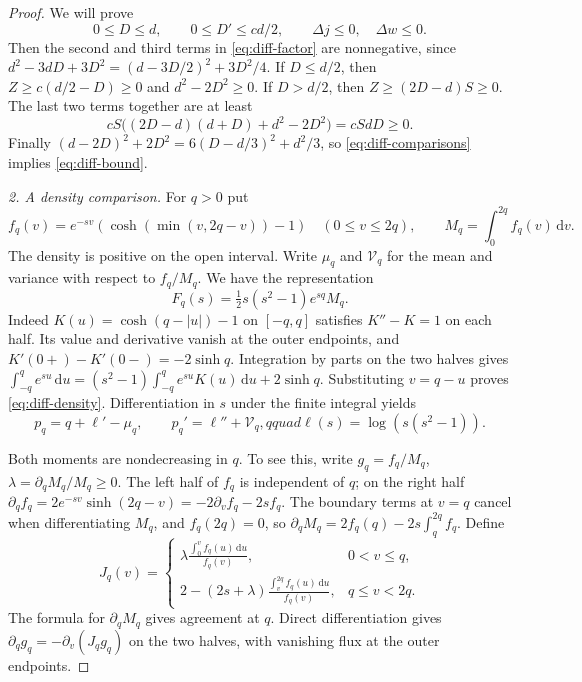\documentclass[10pt,twoside,reqno]{amsart}
\numberwithin{equation}{section}
\newcommand{\dd}{\,\mathrm{d}}
\begin{document}
\begin{proof}
We will prove
\begin{equation}\label{eq:diff-comparisons}
 0\le D\le d,\qquad 0\le D'\le cd/2,\qquad
 \Delta j\le0,\quad \Delta w\le0 .
\end{equation}
Then the second and third terms in \eqref{eq:diff-factor} are nonnegative,
since \(d^2-3dD+3D^2=(d-3D/2)^2+3D^2/4\).
If \(D\le d/2\), then \(Z\ge c(d/2-D)\ge0\) and
\(d^2-2D^2\ge0\). If \(D>d/2\), then \(Z\ge(2D-d)S\ge0\).
The last two terms together are at least
\[
 cS\bigl((2D-d)(d+D)+d^2-2D^2\bigr)=cS dD\ge0.
\]
Finally \((d-2D)^2+2D^2=6(D-d/3)^2+d^2/3\), so
\eqref{eq:diff-comparisons} implies \eqref{eq:diff-bound}.

\medskip\noindent
\textit{2. A density comparison.}
For \(q>0\) put
\[
 f_q(v)=e^{-sv}(\cosh(\min(v,2q-v))-1)\quad (0\le v\le 2q),
 \qquad M_q=\int_0^{2q} f_q(v)\dd v.
\]
The density is positive on the open interval. Write \(\mu_q\) and
\(\mathcal V_q\) for the mean and variance with respect to \(f_q/M_q\).
We have the representation
\begin{equation}\label{eq:diff-density}
 F_q(s)=\tfrac12 s(s^2-1)e^{sq}M_q.
\end{equation}
Indeed \(K(u)=\cosh(q-|u|)-1\) on \([-q,q]\) satisfies \(K''-K=1\)
on each half. Its value and derivative vanish at the outer endpoints,
and \(K'(0+)-K'(0-)=-2\sinh q\).
Integration by parts on the two halves gives
\(\int_{-q}^q e^{su}\dd u=(s^2-1)\int_{-q}^q e^{su}K(u)\dd u
 +2\sinh q\). Substituting \(v=q-u\) proves \eqref{eq:diff-density}.
Differentiation in \(s\) under the finite integral yields
\[
 p_q=q+\ell'-\mu_q,\qquad p_q'=\ell''+\mathcal V_q,qquad
 \ell(s)=\log(s(s^2-1)).
\]

Both moments are nondecreasing in \(q\). To see this, write
\(g_q=f_q/M_q\), \(\lambda=\partial_q M_q/M_q\ge0\).
The left half of \(f_q\) is independent of \(q\); on the right half
\(\partial_q f_q=2e^{-sv}\sinh(2q-v)=-2\partial_v f_q-2s f_q\).
The boundary terms at \(v=q\) cancel when differentiating \(M_q\), and
\(f_q(2q)=0\), so
\(\partial_q M_q=2f_q(q)-2s\int_q^{2q}f_q\).
Define
\[
 J_q(v)=
 \begin{cases}
  \lambda\displaystyle\frac{\int_0^v f_q(u)\dd u}{f_q(v)},&0<v\le q,\\[6pt]
  2-(2s+\lambda)\displaystyle\frac{\int_v^{2q} f_q(u)\dd u}{f_q(v)},
    &q\le v<2q .
 \end{cases}
\]
The formula for \(\partial_q M_q\) gives agreement at \(q\).
Direct differentiation gives \(\partial_q g_q=-\partial_v(J_q g_q)\)
on the two halves, with vanishing flux at the outer endpoints.


\end{proof}
\end{document}
